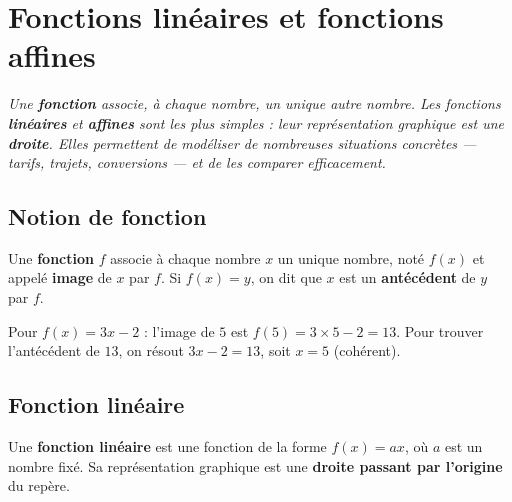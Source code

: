 \chapter{Fonctions linéaires et fonctions affines}

\noindent\textit{Une \textbf{fonction} associe, à chaque nombre, un unique autre nombre. Les
fonctions \textbf{linéaires} et \textbf{affines} sont les plus simples : leur représentation
graphique est une \textbf{droite}. Elles permettent de modéliser de nombreuses situations
concrètes — tarifs, trajets, conversions — et de les comparer efficacement.}
\vspace{8pt}

\connecteBanner

\section{Notion de fonction}

\begin{definition}
Une \textbf{fonction} $f$ associe à chaque nombre $x$ un unique nombre, noté $f(x)$ et
appelé \textbf{image} de $x$ par $f$. Si $f(x)=y$, on dit que $x$ est un \textbf{antécédent}
de $y$ par $f$.
\end{definition}

\begin{exemple}
Pour $f(x)=3x-2$ : l'image de $5$ est $f(5)=3\times5-2=13$. Pour trouver l'antécédent de
$13$, on résout $3x-2=13$, soit $x=5$ (cohérent).
\end{exemple}

\section{Fonction linéaire}

\begin{definition}
Une \textbf{fonction linéaire} est une fonction de la forme $f(x)=ax$, où $a$ est un nombre
fixé. Sa représentation graphique est une \textbf{droite passant par l'origine} du repère.
\end{definition}

\begin{illus}
\end{illus}

